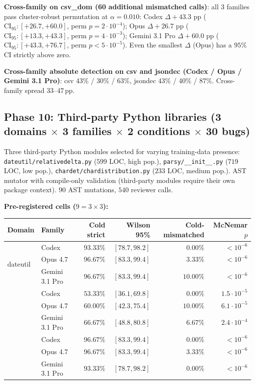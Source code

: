 \textbf{Cross-family on csv\_dom (60 additional mismatched calls)}: all $3$ families pass cluster-robust permutation at $\alpha = 0.010$:
Codex $\Delta\!+\!43.3$ pp ($\text{CI}_{95}\!:[+26.7, +60.0]$, perm $p = 2\cdot 10^{-4}$);
Opus $\Delta\!+\!26.7$ pp ($\text{CI}_{95}\!:[+13.3, +43.3]$, perm $p = 4\cdot 10^{-3}$);
Gemini 3.1 Pro $\Delta\!+\!60.0$ pp ($\text{CI}_{95}\!:[+43.3, +76.7]$, perm $p < 5\cdot 10^{-5}$).
Even the smallest $\Delta$ (Opus) has a $95\%$ CI strictly above zero.

\textbf{Cross-family absolute detection on csv and jsondec (Codex / Opus / Gemini 3.1 Pro)}: csv 43\% / 30\% / 63\%, jsondec 43\% / 40\% / 87\%. Cross-family spread $33$--$47\,\mathrm{pp}$.

\subsection{Phase 10: Third-party Python libraries (3 domains $\times$ 3 families $\times$ 2 conditions $\times$ 30 bugs)}
\label{sec:phase10}

Three third-party Python modules selected for varying training-data presence: \texttt{dateutil/relativedelta.py} ($599$ LOC, high pop.), \texttt{parsy/\_\_init\_\_.py} ($719$ LOC, low pop.), \texttt{chardet/chardistribution.py} ($233$ LOC, medium pop.). AST mutator with compile-only validation (third-party modules require their own package context). $90$ AST mutations, $540$ reviewer calls.

\textbf{Pre-registered cells ($9 = 3 \times 3$):}

\begin{center}
\small
\begin{tabular}{@{}llrrrr@{}}
\toprule
Domain & Family & Cold strict & Wilson 95\% & Cold-mismatched & McNemar $p$ \\
\midrule
\multirow{3}{*}{dateutil} & Codex & $93.33\%$ & $[78.7, 98.2]$ & $0.00\%$ & $< 10^{-6}$ \\
 & Opus 4.7 & $96.67\%$ & $[83.3, 99.4]$ & $3.33\%$ & $< 10^{-6}$ \\
 & Gemini 3.1 Pro & $96.67\%$ & $[83.3, 99.4]$ & $10.00\%$ & $< 10^{-6}$ \\
\addlinespace
\multirow{3}{*}{parsy} & Codex & $53.33\%$ & $[36.1, 69.8]$ & $0.00\%$ & $1.5\cdot 10^{-5}$ \\
 & Opus 4.7 & $60.00\%$ & $[42.3, 75.4]$ & $10.00\%$ & $6.1\cdot 10^{-5}$ \\
 & Gemini 3.1 Pro & $66.67\%$ & $[48.8, 80.8]$ & $6.67\%$ & $2.4\cdot 10^{-4}$ \\
\addlinespace
\multirow{3}{*}{chardet} & Codex & $96.67\%$ & $[83.3, 99.4]$ & $0.00\%$ & $< 10^{-6}$ \\
 & Opus 4.7 & $96.67\%$ & $[83.3, 99.4]$ & $3.33\%$ & $< 10^{-6}$ \\
 & Gemini 3.1 Pro & $93.33\%$ & $[78.7, 98.2]$ & $0.00\%$ & $< 10^{-6}$ \\
\bottomrule
\end{tabular}
\end{center}

